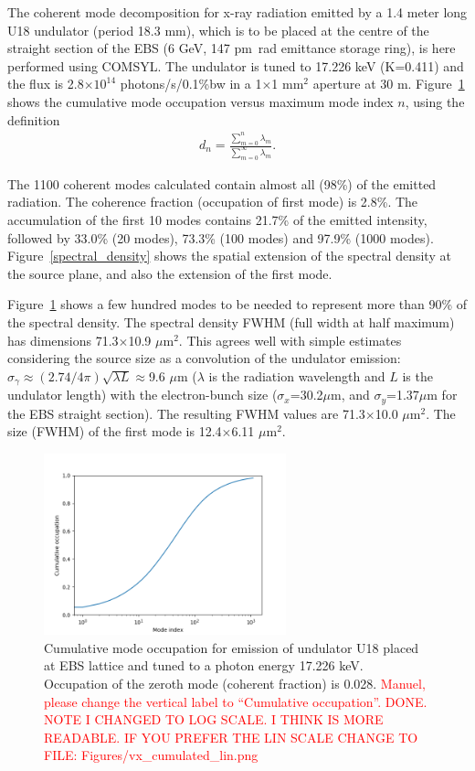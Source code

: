 \documentclass[%
 reprint,
 amsmath,amssymb,
 aps,
]{revtex4-1}
\begin{document}
The coherent mode decomposition for x-ray radiation emitted by a 1.4 meter long U18 undulator (period 18.3 mm), which is to be placed at the centre of the straight section of the EBS (6 GeV, 147 pm~rad emittance storage ring), is here performed using COMSYL. The undulator is tuned to 17.226 keV (K=0.411) and the flux is 2.8$\times 10^{14}$ photons/s/0.1\%bw in a 1$\times$1 mm$^2$ aperture at 30 m. Figure~\ref{cumulative_mode_occupation} shows the cumulative mode occupation versus maximum mode index $n$, using the definition
\begin{equation}
\begin{aligned}
\label{spectrum}
d_n=\frac{\sum_{m=0}^{n} \lambda_m}{\sum_{m=0}^{\infty} \lambda_m}.
\end{aligned}
\end{equation}

The 1100 coherent modes calculated contain almost all (98\%) of the emitted radiation. The coherence fraction (occupation of first mode) is 2.8\%. The accumulation of the first 10 modes contains 21.7\% of the emitted intensity, followed by 33.0\% (20 modes), 73.3\% (100 modes) and 97.9\% (1000 modes). 
Figure~\ref{spectral_density} shows the spatial extension of the spectral density at the source plane, and also the extension of the first mode.

Figure~\ref{cumulative_mode_occupation} shows a few hundred modes to be needed to represent more than 90\% of the spectral density. The spectral density FWHM (full width at half maximum) has dimensions 71.3$\times$10.9 $\mu$m$^2$. This agrees well with simple estimates considering the source size as a convolution of the undulator emission: $\sigma_\gamma\approx (2.74/4\pi) \sqrt{\lambda L}\approx$9.6 $\mu$m ($\lambda$ is the radiation wavelength and $L$ is the undulator length) with the electron-bunch size ($\sigma_x$=30.2$\mu$m, and $\sigma_y$=1.37$\mu$m for the EBS straight section). The resulting FWHM values are 71.3$\times$10.0 $\mu$m$^2$. The size (FWHM) of the first mode is 12.4$\times$6.11 $\mu$m$^2$.  

\begin{figure}
\includegraphics[width=7cm]{Figures/vx_cumulated.png}
\caption{Cumulative mode occupation for  emission of undulator U18 placed at EBS lattice and tuned to a photon energy 17.226 keV. Occupation of the zeroth mode (coherent fraction) is 0.028. \textcolor{red}{Manuel, please change the vertical label to ``Cumulative occupation''. DONE. NOTE I CHANGED TO LOG SCALE. I THINK IS MORE READABLE. IF YOU PREFER THE LIN SCALE CHANGE TO FILE: Figures/vx\_cumulated\_lin.png}}
\label{cumulative_mode_occupation}
\end{figure}
\end{document}
